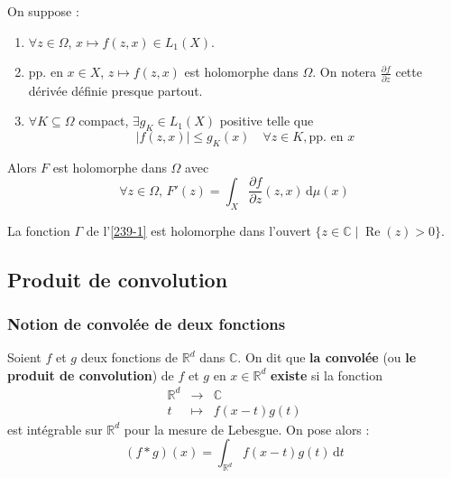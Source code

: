   \begin{theorem}
    On suppose :
    \begin{enumerate}[label={\bfseries(\roman*)}]
      \item $\forall z \in \Omega$, $x \mapsto f(z,x) \in L_1(X)$.
      \item pp. en $x \in X$, $z \mapsto f(z,x)$ est holomorphe dans $\Omega$. On notera $\frac{\partial f}{\partial z}$ cette dérivée définie presque partout.
      \item $\forall K \subseteq \Omega$ compact, $\exists g_K \in L_1(X)$ positive telle que
      \[ \left| f(z,x) \right| \leq g_K(x) \quad \forall z \in K, \text{pp. en } x \]
    \end{enumerate}
    Alors $F$ est holomorphe dans $\Omega$ avec
    \[ \forall z \in \Omega, \, F'(z) = \int_X \frac{\partial f}{\partial z}(z, x) \, \mathrm{d}\mu(x) \]
  \end{theorem}


  \begin{example}
    La fonction $\Gamma$ de l'\cref{239-1} est holomorphe dans l'ouvert $\{ z \in \mathbb{C} \mid \operatorname{Re}(z) > 0 \}$.
  \end{example}

  \subsection{Produit de convolution}

  \subsubsection{Notion de convolée de deux fonctions}


  \begin{definition}
    Soient $f$ et $g$ deux fonctions de $\mathbb{R}^d$ dans $\mathbb{C}$. On dit que \textbf{la convolée} (ou \textbf{le produit de convolution}) de $f$ et $g$ en $x \in \mathbb{R}^d$ \textbf{existe} si la fonction
    \[
    \begin{array}{ccc}
      \mathbb{R}^d &\rightarrow& \mathbb{C} \\
      t &\mapsto& f(x-t)g(t)
    \end{array}
    \]
    est intégrable sur $\mathbb{R}^d$ pour la mesure de Lebesgue. On pose alors :
    \[ (f * g)(x) = \int_{\mathbb{R}^d} f(x-t)g(t) \, \mathrm{d}t \]
  \end{definition}

